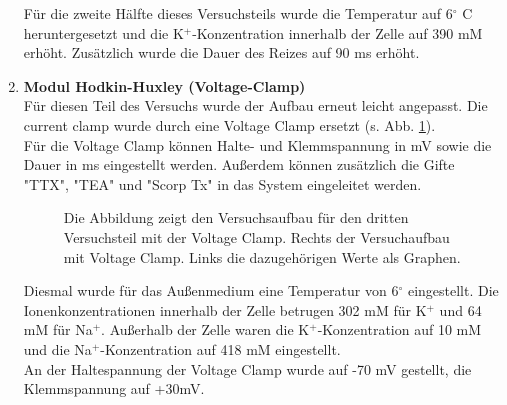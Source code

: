 \documentclass[11pt]{article}
\begin{document}
\begin{enumerate}
Für die zweite Hälfte dieses Versuchsteils wurde die Temperatur auf 6$^\circ$ C heruntergesetzt und die K$^+$-Konzentration innerhalb der Zelle auf 390 mM erhöht. Zusätzlich wurde die Dauer des Reizes auf 90 ms erhöht.

\item \textbf{Modul Hodkin-Huxley (Voltage-Clamp)}\\
Für diesen Teil des Versuchs wurde der Aufbau erneut leicht angepasst. Die current clamp wurde durch eine Voltage Clamp ersetzt (s. Abb. \ref{a3_aufbau}).\\
Für die Voltage Clamp können Halte- und Klemmspannung in mV sowie die Dauer in ms eingestellt werden. Außerdem können zusätzlich die Gifte "{}TTX"{}, "{}TEA"{} und "{}Scorp Tx"{} in das System eingeleitet werden.

\begin{figure}[H]
\caption{Die Abbildung zeigt den Versuchsaufbau für den dritten Versuchsteil mit der Voltage Clamp. Rechts der Versuchaufbau mit Voltage Clamp. Links die dazugehörigen Werte als Graphen.}
\label{a3_aufbau}
\end{figure}
Diesmal wurde für das Außenmedium eine Temperatur von 6$^\circ$ eingestellt. Die Ionenkonzentrationen innerhalb der Zelle betrugen 302 mM für K$^+$ und 64 mM für Na$^+$. Außerhalb der Zelle waren die K$^+$-Konzentration auf 10 mM und die Na$^+$-Konzentration auf 418 mM eingestellt.\\
An der Haltespannung der Voltage Clamp wurde auf -70 mV gestellt, die Klemmspannung auf +30mV.\\


\end{enumerate}
\end{document}
